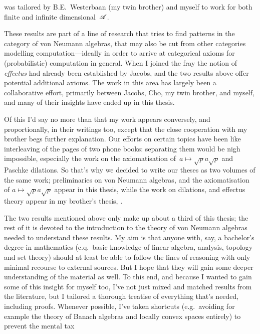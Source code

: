\documentclass[b5paper]{book}
\begin{document}
\begin{parsec}
\begin{point}
\begin{enumerate}
was tailored by B.E.~Westerbaan (my twin brother) and myself to work for
both finite and infinite dimensional~$\mathscr{A}$.
\end{enumerate}
These results
are part of a line of research that
tries to find patterns
in the category of von Neumann algebras,
that may also be cut from other categories
modelling computation---ideally in order to arrive at categorical axioms
for (probabilistic) computation in general.
When I joined the fray
the notion of \emph{effectus}\cite{newdirections} had already
been established by Jacobs,
and the two results
above offer potential additional axioms.
The work in this area has largely been a collaborative effort,
primarily between Jacobs, Cho, my twin brother, and myself,
and many of their insights have ended up in this thesis.

Of this I'd say no more
than that my work appears conversely, and proportionally,
in their writings too, except that the close cooperation
with my brother begs further explanation.
Our efforts on certain topics have been like interleaving 
of the pages of two phone books:
separating them  would be nigh impossible,
especially the work on the axiomatisation
of~$a\mapsto \sqrt{p}a\sqrt{p}$ and Paschke dilations.
So that's why we decided to write our theses
as two volumes of the same work;
preliminaries on von Neumann algebras,
and the axiomatisation of $a\mapsto \sqrt{p}a\sqrt{p}$
appear in this thesis,
while the work on dilations,
and effectus theory appear in my brother's thesis,
\cite{bas}.
\end{point}
\begin{point}
The two results mentioned above only
make up 
about a third of this thesis;
the rest of it is devoted to 
the introduction to the theory of von Neumann algebras
needed to understand these results.
My aim is that anyone 
with, say, a bachelor's degree in mathematics
(c.q.~basic knowledge of linear algebra,
analysis\cite{rudin1964principles}, 
topology\cite{willard}
and set theory\cite{devlin2012joy})
should at least be able to follow the lines of reasoning
with only minimal recourse to external sources.
But I hope that they will gain some deeper understanding
of the material as well.
To this end, and because I wanted to gain some of this insight
for myself too,
I've not just mixed
and matched
results from the literature,
but I tailored a thorough treatise
of everything that's needed,
including proofs.
Whenever possible,
I've taken shortcuts
(e.g.~avoiding for example
the theory of Banach algebras
and locally convex spaces entirely)
to  prevent the mental tax

\end{point}
\end{parsec}
\end{document}
